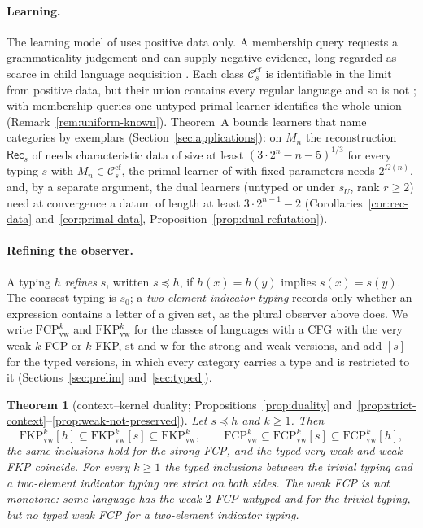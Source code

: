 \documentclass[11pt]{article}
\numberwithin{equation}{section}
\theoremstyle{plain}
\theoremstyle{definition}
\theoremstyle{remark}
\theoremstyle{plain}
\newtheorem{mainthm}{Theorem}
\newcommand{\Ccf}[1]{\mathcal C^{\mathrm{cf}}_{#1}}
\newcommand{\FCP}[2]{\mathrm{FCP}^{#1}_{\mathrm{#2}}}
\newcommand{\FKP}[2]{\mathrm{FKP}^{#1}_{\mathrm{#2}}}
\newcommand{\tFCP}[3]{\mathrm{FCP}^{#1}_{\mathrm{#2}}[#3]}
\newcommand{\tFKP}[3]{\mathrm{FKP}^{#1}_{\mathrm{#2}}[#3]}
\begin{document}
\paragraph{Learning.}
The learning model of \citet{kuriyama-tcs1} uses positive data only.  A
membership query requests a grammaticality judgement and can supply negative
evidence, long regarded as scarce in child language acquisition
\citep{marcus1993}.  Each class $\Ccf s$ is identifiable in the limit from positive
data, but their union contains every regular language
\citep[Prop.~3.1]{kuriyama-tcs1} and so is not \citep{gold1967}; with
membership queries one untyped primal learner identifies the whole union
(Remark~\ref{rem:uniform-known}).  Theorem~A bounds learners that name
categories by exemplars (Section~\ref{sec:applications}): on $M_n$ the
reconstruction $\mathsf{Rec}_s$ of \citet{kuriyama-tcs1} needs characteristic
data of size at least $(3\cdot2^n-n-5)^{1/3}$ for every typing $s$ with
$M_n\in\Ccf s$, the primal learner of \citet{ky2017} with fixed parameters
needs $2^{\Omega(n)}$, and, by a separate argument, the dual learners
(untyped or under $s_U$, rank $r\ge2$) need at convergence a datum of length
at least $3\cdot2^{n-1}-2$ (Corollaries~\ref{cor:rec-data}
and~\ref{cor:primal-data}, Proposition~\ref{prop:dual-refutation}).

\paragraph{Refining the observer.}
A typing $h$ \emph{refines} $s$, written $s\preceq h$, if $h(x)=h(y)$ implies
$s(x)=s(y)$.  The coarsest typing is $s_0$; a \emph{two-element indicator
typing} records only whether an expression contains a letter of a given
set, as the plural observer above does.  We write $\FCP{k}{vw}$ and
$\FKP{k}{vw}$ for the classes of languages with a CFG with the very weak
$k$-FCP or $k$-FKP, $\mathrm{st}$ and $\mathrm{w}$ for the strong and weak
versions, and add $[s]$ for the typed versions, in which every category
carries a type and is restricted to it (Sections~\ref{sec:prelim}
and~\ref{sec:typed}).

\begin{mainthm}[context--kernel duality; Propositions~\ref{prop:duality}
and~\ref{prop:strict-context}--\ref{prop:weak-not-preserved}]
Let $s\preceq h$ and $k\ge1$.  Then
\[
\tFKP{k}{vw}{h}\subseteq\tFKP{k}{vw}{s}\subseteq\FKP{k}{vw},\qquad
\FCP{k}{vw}\subseteq\tFCP{k}{vw}{s}\subseteq\tFCP{k}{vw}{h},
\]
the same inclusions hold for the strong FCP, and the typed very weak and
weak FKP coincide.  For every $k\ge1$ the typed
inclusions between the trivial typing and a two-element indicator typing
are strict on both sides.  The weak FCP is not monotone: some language has
the weak $2$-FCP untyped and for the trivial typing, but no typed weak FCP
for a two-element indicator typing.
\end{mainthm}
\end{document}
